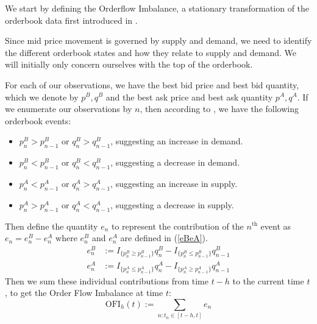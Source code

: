 \documentclass[a4paper, oneside, notitlepage]{book}
\begin{document}
We start by defining the Orderflow Imbalance, a stationary transformation of the orderbook data
first introduced in \cite{CONT2013}.

Since mid price movement is governed by supply and demand, we need to identify
the different orderbook states and how they relate to supply and demand.
We will initially only concern ourselves with the top of the orderbook.

For each of our observations, we have the best bid price and best bid quantity,
which we denote by $p^B, q^B$ and the best ask price and best ask quantity  $p^A, q^A$.
If we enumerate our observations by $n$, then according to \cite{CONT2013}, we have
the following orderbook events:
 \begin{itemize}
     \item $p_n^B > p_{n-1}^B$ or  $q_n^B > q_{n-1}^B$, suggesting an increase in demand.
     \item $p_n^B < p_{n-1}^B$ or  $q_n^B < q_{n-1}^B$, suggesting a decrease in demand.
     \item $p_n^A < p_{n-1}^A$ or  $q_n^A > q_{n-1}^A$, suggesting an increase in supply.
     \item $p_n^A > p_{n-1}^A$ or  $q_n^A < q_{n-1}^A$, suggesting a decrease in supply.
\end{itemize}
Then \cite{CONT2013} define the quantity $e_n$ to represent the contribution of the  $n^{\text{th}}$ event
as $e_n = e_n^B - e_n^A$ where  $e_n^B$ and $e_n^A$ are defined in (\ref{eBeA}).
\begin{equation}
    \begin{aligned}
        e_{n}^B &:= I_{\{ p_{n}^B \geq p_{n-1}^B \}} q_{n}^B  - I_{\{ p_{n}^B \leq p_{n-1}^B \}} q_{n-1}^B \\
        e_{n}^A &:= I_{\{ p_{n}^A \leq p_{n-1}^A \}} q_{n}^A - I_{\{ p_{n}^A \geq p_{n-1}^A \}} q_{n-1}^A
    \end{aligned}
    \label{eBeA}
\end{equation}
Then we sum these individual contributions from time $t-h$ to the current time $t$,
to get the Order Flow Imbalance at time $t$:
\begin{equation}
    \text{OFI}_h(t) := \sum_{n : t_n \in [t-h, t]} e_n
    \label{OFI}
\end{equation}
\end{document}
